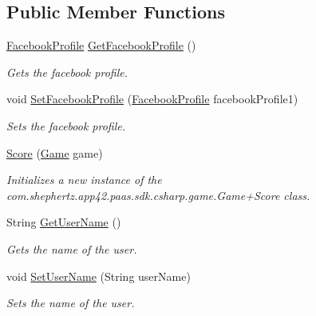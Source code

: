 \subsection*{Public Member Functions}
\begin{DoxyCompactItemize}
\item 
\hyperlink{classcom_1_1shephertz_1_1app42_1_1paas_1_1sdk_1_1csharp_1_1game_1_1_game_1_1_score_1_1_facebook_profile}{Facebook\+Profile} \hyperlink{classcom_1_1shephertz_1_1app42_1_1paas_1_1sdk_1_1csharp_1_1game_1_1_game_1_1_score_ae9d670f3bf1ac01cf1a31ea47f908d13}{Get\+Facebook\+Profile} ()
\begin{DoxyCompactList}\small\item\em Gets the facebook profile. \end{DoxyCompactList}\item 
void \hyperlink{classcom_1_1shephertz_1_1app42_1_1paas_1_1sdk_1_1csharp_1_1game_1_1_game_1_1_score_aff70404b3b7fe1288b9d63675d398c11}{Set\+Facebook\+Profile} (\hyperlink{classcom_1_1shephertz_1_1app42_1_1paas_1_1sdk_1_1csharp_1_1game_1_1_game_1_1_score_1_1_facebook_profile}{Facebook\+Profile} facebook\+Profile1)
\begin{DoxyCompactList}\small\item\em Sets the facebook profile. \end{DoxyCompactList}\item 
\hyperlink{classcom_1_1shephertz_1_1app42_1_1paas_1_1sdk_1_1csharp_1_1game_1_1_game_1_1_score_afb99c32fed964bac6d6a6adcb31cc52d}{Score} (\hyperlink{classcom_1_1shephertz_1_1app42_1_1paas_1_1sdk_1_1csharp_1_1game_1_1_game}{Game} game)
\begin{DoxyCompactList}\small\item\em Initializes a new instance of the com.\+shephertz.\+app42.\+paas.\+sdk.\+csharp.\+game.\+Game+\+Score class. \end{DoxyCompactList}\item 
String \hyperlink{classcom_1_1shephertz_1_1app42_1_1paas_1_1sdk_1_1csharp_1_1game_1_1_game_1_1_score_a4b0cd77104beab2d83b817a77cc6cfe9}{Get\+User\+Name} ()
\begin{DoxyCompactList}\small\item\em Gets the name of the user. \end{DoxyCompactList}\item 
void \hyperlink{classcom_1_1shephertz_1_1app42_1_1paas_1_1sdk_1_1csharp_1_1game_1_1_game_1_1_score_a3437da6c465eaebf0e87e8581a63d8ac}{Set\+User\+Name} (String user\+Name)
\begin{DoxyCompactList}\small\item\em Sets the name of the user. \end{DoxyCompactList}\item 

\end{DoxyCompactItemize}
